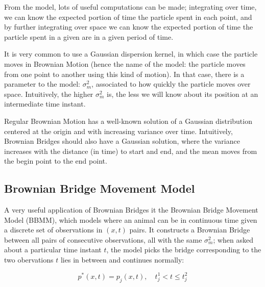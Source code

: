\documentclass[12pt]{article}
\begin{document}
From the model, lots of useful computations can be made; integrating over time, we can know the expected portion of time the particle spent in each point, and by further integrating over space we can know the expected portion of time the particle spent in a given are in a given period of time.

It is very common to use a Gaussian dispersion kernel, in which case the particle moves in Brownian Motion (hence the name of the model: the particle moves from one point to another using this kind of motion). In that case, there is a parameter to the model: $\sigma_m^2$, associated to how quickly the particle moves over space. Intuitively, the higher $\sigma_m^2$ is, the less we will know about its position at an intermediate time instant.

Regular Brownian Motion has a well-known solution of a Gaussian distribution centered at the origin and with increasing variance over time. Intuitively, Brownian Bridges should also have a Gaussian solution, where the variance increases with the distance (in time) to start and end, and the mean moves from the begin point to the end point.



\subsection{Brownian Bridge Movement Model}

A very useful application of Brownian Bridges it the Brownian Bridge Movement Model (BBMM), which models where an animal can be in continuous time given a discrete set of observations in $(x,t)$ pairs. It constructs a Brownian Bridge between all pairs of consecutive observations, all with the same $\sigma_m^2$; when asked about a particular time instant $t$, the model picks the bridge corresponding to the two obervations $t$ lies in between and continues normally:

\[ p^*(x,t) = p_j(x,t), \quad t_j^1 < t \leq t_j^2 \]
\end{document}
